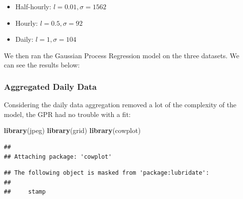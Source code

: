 \documentclass[
]{article}
\newenvironment{Shaded}{\begin{snugshade}}{\end{snugshade}}
\newcommand{\FunctionTok}[1]{\textcolor[rgb]{0.13,0.29,0.53}{\textbf{#1}}}
\newcommand{\NormalTok}[1]{#1}
\providecommand{\tightlist}{%
  \setlength{\itemsep}{0pt}\setlength{\parskip}{0pt}}
\begin{document}
\begin{itemize}
\tightlist
\item
  Half-hourly: \(l = 0.01, \sigma = 1562\)
\item
  Hourly: \(l = 0.5, \sigma = 92\)
\item
  Daily: \(l = 1, \sigma = 104\)
\end{itemize}

We then ran the Gaussian Process Regression model on the three datasets.
We can see the results below:

\hypertarget{aggregated-daily-data}{%
\subsubsection{Aggregated Daily Data}\label{aggregated-daily-data}}

Considering the daily data aggregation removed a lot of the complexity
of the model, the GPR had no trouble with a fit:

\begin{Shaded}
\begin{Highlighting}[]
\FunctionTok{library}\NormalTok{(jpeg)}
\FunctionTok{library}\NormalTok{(grid)}
\FunctionTok{library}\NormalTok{(cowplot)}
\end{Highlighting}
\end{Shaded}

\begin{verbatim}
## 
## Attaching package: 'cowplot'
\end{verbatim}

\begin{verbatim}
## The following object is masked from 'package:lubridate':
## 
##     stamp
\end{verbatim}
\end{document}
